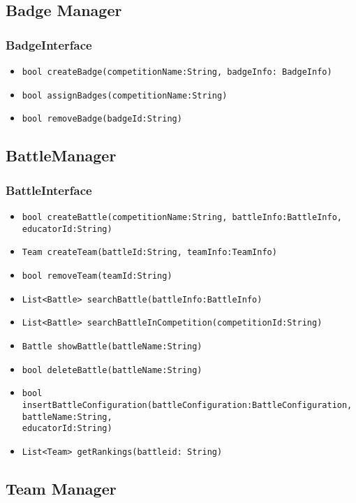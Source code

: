 \subsection{Badge Manager}
\subsubsection{BadgeInterface}
\begin{itemize}
    \item \texttt{bool createBadge(competitionName:String, badgeInfo: BadgeInfo)}%
    \item \texttt{bool assignBadges(competitionName:String)}
    \item \texttt{bool removeBadge(badgeId:String)}
\end{itemize}

\subsection{BattleManager}
\subsubsection{BattleInterface}
\begin{itemize}
    \item \texttt{bool createBattle(competitionName:String, battleInfo:BattleInfo, educatorId:String)}
    \item \texttt{Team createTeam(battleId:String, teamInfo:TeamInfo)}%
    \item \texttt{bool removeTeam(teamId:String)}
    \item \texttt{List<Battle> searchBattle(battleInfo:BattleInfo)}
    \item \texttt{List<Battle> searchBattleInCompetition(competitionId:String)}%
    \item \texttt{Battle showBattle(battleName:String)}
    \item \texttt{bool deleteBattle(battleName:String)}
    \item \texttt{bool insertBattleConfiguration(battleConfiguration:BattleConfiguration, battleName:String,\\educatorId:String)}%
    \item \texttt{List<Team> getRankings(battleid: String)}
\end{itemize}

\subsection{Team Manager}
